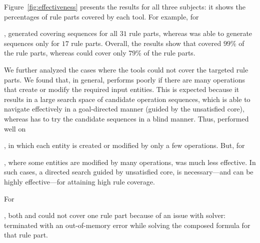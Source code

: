 Figure~\ref{fig:effectiveness} presents the results for all three subjects: it
shows the percentages of rule parts covered by each tool. For example, for
\subject{Cebu-pacific}, \tool{} generated covering sequences for all $31$ rule
parts, whereas \exhaust{} was able to generate sequences only for $17$ rule
parts. Overall, the results show that \tool{} covered $99$\% of the rule parts,
whereas \exhaust{} could cover only $79$\% of the rule parts.

We further analyzed the cases where the tools could not cover the targeted rule
parts. We found that, in general, \exhaust{} performs poorly if there are many
operations that create or modify the required input entities. This is expected
because it results in a large search space of candidate operation sequences,
which \tool{} is able to navigate effectively in a goal-directed manner (guided
by the unsatisfied core), whereas \exhaust{} has to try the candidate sequences
in a blind manner. Thus, \exhaust{} performed well on \subject{jBilling}, in
which each entity is created or modified by only a few operations. But, for
\subject{Cebu-pacific}, where some entities are modified by many operations,
\exhaust{} was much less effective. In such cases, a directed search guided by
unsatisfied core, is necessary---and can be highly effective---for attaining
high rule coverage.

For \subject{jBilling}, both \tool{} and \exhaust{} could not cover one rule
part because of an issue with \choco{} solver: \choco{} terminated with an
out-of-memory error while solving the composed formula for that rule part.


